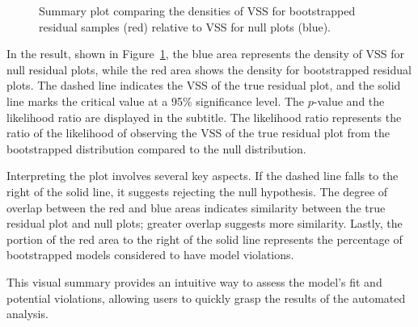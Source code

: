 \documentclass[
doublespace,
  times]{anzsauth}
\begin{document}
\begin{figure}[H]


\caption{\label{fig-summary-plot}Summary plot comparing the densities of
VSS for bootstrapped residual samples (red) relative to VSS for null
plots (blue).}

\end{figure}%

In the result, shown in Figure~\ref{fig-summary-plot}, the blue area
represents the density of VSS for null residual plots, while the red
area shows the density for bootstrapped residual plots. The dashed line
indicates the VSS of the true residual plot, and the solid line marks
the critical value at a 95\% significance level. The \(p\)-value and the
likelihood ratio are displayed in the subtitle. The likelihood ratio
represents the ratio of the likelihood of observing the VSS of the true
residual plot from the bootstrapped distribution compared to the null
distribution.

Interpreting the plot involves several key aspects. If the dashed line
falls to the right of the solid line, it suggests rejecting the null
hypothesis. The degree of overlap between the red and blue areas
indicates similarity between the true residual plot and null plots;
greater overlap suggests more similarity. Lastly, the portion of the red
area to the right of the solid line represents the percentage of
bootstrapped models considered to have model violations.

This visual summary provides an intuitive way to assess the model's fit
and potential violations, allowing users to quickly grasp the results of
the automated analysis.
\end{document}
